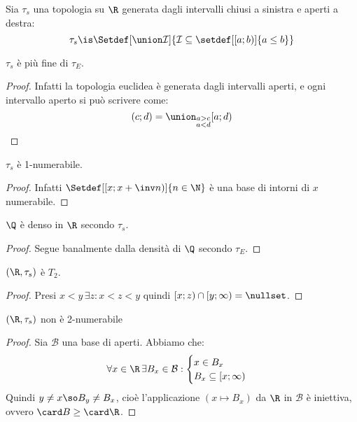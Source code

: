 \begin{defn}
	Sia $\tau_s$ una topologia su $\R$ generata dagli intervalli chiusi a sinistra e aperti a destra:
	\[\tau_s\is\Setdef[\union\mathcal I]{\mathcal I\subseteq\setdef[[a;b)]{a\leq b}}\]
\end{defn}

\begin{prop}
	$\tau_s$ è più fine di $\tau_E$.
\end{prop}

\begin{proof}
	Infatti la topologia euclidea è generata dagli intervalli aperti,
	e ogni intervallo aperto si può scrivere come:
	\[(c;d)=\union_{\substack{a>c\\a<d}}[a;d)
	\qedhere\]
\end{proof}

\begin{prop}
	$\tau_s$ è 1-numerabile.
\end{prop}

\begin{proof}
	Infatti $\Setdef[\left[x;x+\inv n\right)]{n\in\N}$ è una base di intorni di $x$ numerabile.
\end{proof}

\begin{prop}
	$\Q$ è denso in $\R$ secondo $\tau_s$.
\end{prop}

\begin{proof}
	Segue banalmente dalla densità di $\Q$ secondo $\tau_E$.
\end{proof}

\begin{prop}
	$(\R,\tau_s)$ è $T_2$.
\end{prop}

\begin{proof}
	Presi $x<y\,\exists z:x<z<y$ quindi $[x;z)\cap[y;\infty)=\nullset$.
\end{proof}

\begin{prop}
	$(\R,\tau_s)$ non è 2-numerabile
\end{prop}

\begin{proof}
	Sia $\mathcal B$ una base di aperti.
	Abbiamo che:
	\[\forall x\in\R\,\exists B_x\in\mathcal B:
	\begin{cases}
		x\in B_x\\
		B_x\subseteq [x;\infty)
	\end{cases}\]
	Quindi $y\neq x\so B_y\neq B_x$,
	cioè l'applicazione $(x\mapsto B_x)$ da $\R$ in $\mathcal B$ è iniettiva,
	ovvero $\card B\geq\card\R$.
\end{proof}

